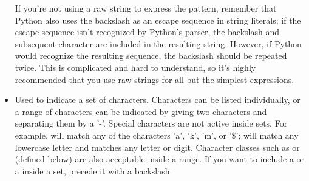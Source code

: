 \begin{itemize}
If you're not using a raw string to
express the pattern, remember that Python also uses the
backslash as an escape sequence in string literals; if the escape
sequence isn't recognized by Python's parser, the backslash and
subsequent character are included in the resulting string.  However,
if Python would recognize the resulting sequence, the backslash should
be repeated twice.   This is complicated and hard to understand, so
it's highly recommended that you use raw strings for all but the simplest expressions.
%
\item[\code{[]}] Used to indicate a set of characters.  Characters can
be listed individually, or a range of characters can be indicated by
giving two characters and separating them by a '-'.  Special
characters are not active inside sets.  For example, \code{[akm\$]}
will match any of the characters 'a', 'k', 'm', or '\$'; \code{[a-z]}
will match any lowercase letter and \code{[a-zA-Z0-9]} matches any
letter or digit.  Character classes such as  or  (defined below) are also acceptable inside a range.  If you want to
include a \code{]} or a \code{-} inside a set, precede it with a
backslash.


\end{itemize}
